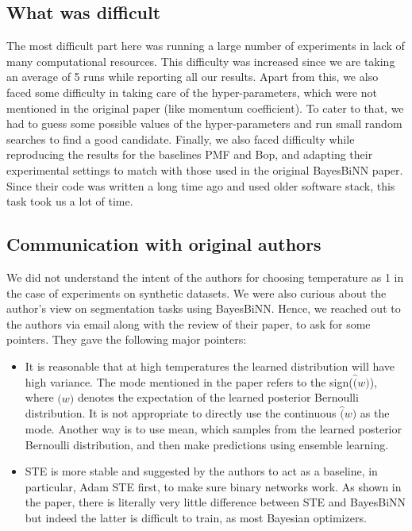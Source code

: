 \subsection{What was difficult}
The most difficult part here was running a large number of experiments in lack of many computational resources. This difficulty was increased since we are taking an average of 5 runs while reporting all our results. Apart from this, we also faced some difficulty in taking care of the hyper-parameters, which were not mentioned in the original paper (like momentum coefficient). To cater to that, we had to guess some possible values of the hyper-parameters and run small random searches to find a good candidate. Finally, we also faced difficulty while reproducing the results for the baselines PMF and Bop, and adapting their experimental settings to match with those used in the original BayesBiNN paper. Since their code was written a long time ago and used older software stack, this task took us a lot of time.

\subsection{Communication with original authors}
We did not understand the intent of the authors for choosing temperature as 1 in the case of experiments on synthetic datasets. We were also curious about the author's view on segmentation tasks using BayesBiNN. Hence, we reached out to the authors via email along with the review of their paper, to ask for some pointers. They gave the following major pointers:
\begin{itemize}
    \item It is reasonable that at high temperatures the learned distribution will have high variance. The mode mentioned in the paper refers to the sign($\hat(w)$), where $\hat(w)$ denotes the expectation of the learned posterior Bernoulli distribution. It is not appropriate to directly use the continuous $\hat(w)$ as the mode. Another way is to use mean, which samples from the learned posterior Bernoulli distribution, and then make predictions using ensemble learning.
    \item STE is more stable and suggested by the authors to act as a baseline, in particular, Adam STE first, to make sure binary networks work. As shown in the paper, there is literally very little difference between STE and BayesBiNN but indeed the latter is difficult to train, as most Bayesian optimizers.
\end{itemize}

